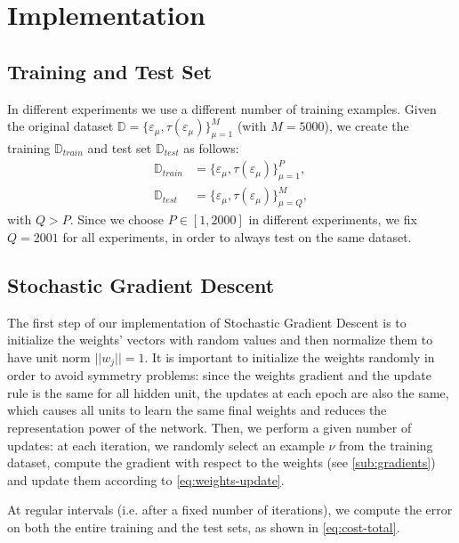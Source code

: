 \section{Implementation}
\label{sec:implementation}

\subsection{Training and Test Set}
In different experiments we use a different number of training examples.
Given the original dataset $\mathbb{D} = \{ \varepsilon_\mu, \tau(\varepsilon_\mu)\}_{\mu=1}^M$ (with $M = 5000$), we create the training $\mathbb{D}_{train}$ and test set $\mathbb{D}_{test}$ as follows:
\begin{equation*}
    \begin{split}
        \mathbb{D}_{train} &= \{ \varepsilon_\mu, \tau(\varepsilon_\mu)\}_{\mu=1}^P, \\
        \mathbb{D}_{test} &= \{ \varepsilon_\mu, \tau(\varepsilon_\mu)\}_{\mu=Q}^M,
    \end{split}
\end{equation*}
with $Q > P$.
Since we choose $P \in [1, 2000]$ in different experiments, we fix $Q = 2001$ for all experiments, in order to always test on the same dataset. 

\subsection{Stochastic Gradient Descent}
The first step of our implementation of Stochastic Gradient Descent is to initialize the weights' vectors with random values and then normalize them to have unit norm $||w_j|| = 1$.
It is important to initialize the weights randomly in order to avoid symmetry problems:
since the weights gradient and the update rule is the same for all hidden unit, the updates at each epoch are also the same, which causes all units to learn the same final weights and reduces the representation power of the network.
Then, we perform a given number of updates:
at each iteration, we randomly select an example $\nu$ from the training dataset, compute the gradient with respect to the weights (see \cref{sub:gradients}) and update them according to \cref{eq:weights-update}.

At regular intervals (i.e. after a fixed number of iterations), we compute the error on both the entire training and the test sets, as shown in \cref{eq:cost-total}.
